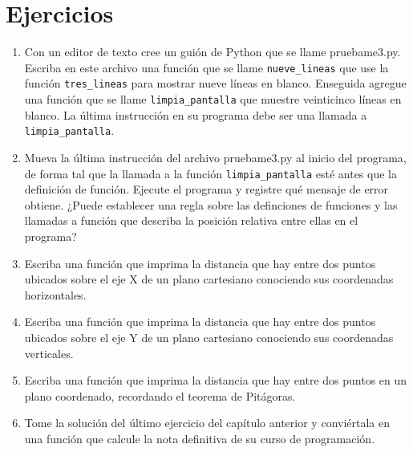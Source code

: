 \section{Ejercicios}
\begin{enumerate}

 \item Con un editor de texto cree un guión de Python que se llame pruebame3.py. Escriba en este 
 archivo una función que se llame \verb+nueve_lineas+ que use la función \verb+tres_lineas+ para mostrar nueve líneas 
 en blanco. Enseguida agregue una función que se llame \verb+limpia_pantalla+ que muestre veinticinco líneas en 
 blanco. La última instrucción en su programa debe ser una llamada a \verb+limpia_pantalla+.
 
 \item Mueva la última instrucción del archivo pruebame3.py al inicio del programa, de forma tal que la llamada a la 
 función \verb+limpia_pantalla+ esté antes que la definición de función. Ejecute el programa y registre qué mensaje de 
 error obtiene. ¿Puede establecer una regla sobre las definciones de funciones y las llamadas a función que describa 
 la posición relativa entre ellas en el programa?
 
 \item Escriba una función que imprima la distancia que hay entre dos puntos ubicados sobre el eje X de un plano 
 cartesiano conociendo sus coordenadas horizontales.
 
 \item Escriba una función que imprima la distancia que hay entre dos puntos ubicados sobre el eje Y de un plano 
 cartesiano conociendo sus coordenadas verticales.
 
 \item Escriba una función que imprima la distancia que hay entre dos puntos en un plano coordenado, recordando el teorema
 de Pitágoras.
 
 \item Tome la solución del último ejercicio del capítulo anterior y conviértala en una función que calcule la nota 
 definitiva de su curso de programación.
 
\end{enumerate}
